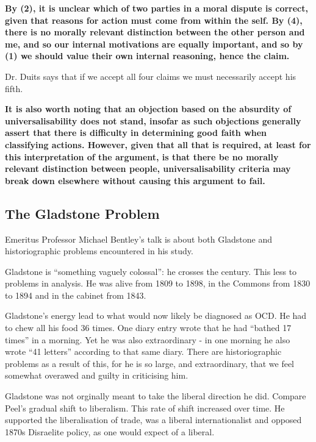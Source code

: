 		\textbf{By (2), it is unclear which of two parties in a moral dispute is correct, given that reasons for action must come from within the self. By (4), there is no morally relevant distinction between the other person and me, and so our internal motivations are equally important, and so by (1) we should value their own internal reasoning, hence the claim.}

		Dr. Duits says that if we accept all four claims we must necessarily accept his fifth.

		\textbf{It is also worth noting that an objection based on the absurdity of universalisability does not stand, insofar as such objections generally assert that there is difficulty in determining good faith when classifying actions. However, given that all that is required, at least for this interpretation of the argument, is that there be no morally relevant distinction between people, universalisability criteria may break down elsewhere without causing this argument to fail.}



	\subsection{The Gladstone Problem}



		Emeritus Professor Michael Bentley's talk is about both Gladstone and historiographic problems encountered in his study.

		Gladstone is ``something vaguely colossal'': he crosses the  century. This less to problems in analysis. He was alive from 1809 to 1898, in the Commons from 1830 to 1894 and in the cabinet from 1843.

		Gladstone's energy lead to what would now likely be diagnosed as OCD. He had to chew all his food 36 times. One diary entry wrote that he had ``bathed 17 times'' in a morning. Yet he was also extraordinary - in one morning he also wrote ``41 letters'' according to that same diary. There are historiographic problems as a result of this, for he is so large, and extraordinary, that we feel somewhat overawed and guilty in criticising him.

		Gladstone was not orginally meant to take the liberal direction he did. Compare Peel's gradual shift to liberalism. This rate of shift increased over time. He supported the liberalisation of trade, was a liberal internationalist and opposed 1870s Disraelite policy, as one would expect of a liberal.

